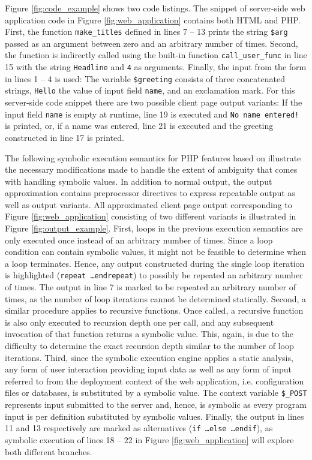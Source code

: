 \documentclass[preprint]{sig-alternate-05-2015}
\begin{document}
Figure \ref{fig:code_example} shows two code listings. The snippet of server-side web
application code in Figure \ref{fig:web_application} contains both HTML and PHP. First, the
function \texttt{make\_titles} defined in lines 7 – 13 prints the string
\texttt{\$arg} passed as an argument between zero and an arbitrary number of
times. Second, the function is indirectly called using the built-in function
\texttt{call\_user\_func} in line 15 with the string \texttt{Headline} and
\texttt{4} as arguments.  Finally, the input from the form in lines 1 – 4 is
used: The variable \texttt{\$greeting} consists of three concatenated strings,
\texttt{Hello} the value of input field \texttt{name}, and an exclamation mark.
For this server-side code snippet there are two possible client page output
variants: If the input field \texttt{name} is empty at runtime, line 19 is
executed and \texttt{No name entered!} is printed, or, if a name was entered,
line 21 is executed and the greeting constructed in line 17 is printed.



The following symbolic execution semantics for PHP features  based on \cite{Nguyen:2014:BCG:2635868.2635928}
illustrate the necessary modifications made to handle the extent of ambiguity
that comes with handling symbolic values. In addition to normal output, the
output approximation contains preprocessor directives to express
repeatable output as well as output variants. All approximated client page
output corresponding to Figure \ref{fig:web_application} consisting of two different variants
is illustrated in Figure \ref{fig:output_example}.
First, loops in the previous execution semantics are only executed once instead
of an arbitrary number of times. Since a loop condition can contain symbolic
values, it might not be feasible to determine when a loop terminates. Hence,
any output constructed during the single loop iteration is highlighted
(\texttt{repeat \ldots  endrepeat}) to possibly be repeated an arbitrary number
of times. The output in line 7 is marked to be repeated an arbitrary number of times, as the number
of loop iterations cannot be determined statically. Second, a similar procedure
applies to recursive functions. Once called, a recursive function is  also only
executed to recursion depth one per call, and any subsequent invocation of that
function returns a symbolic value. This, again, is due to the difficulty to
determine the exact recursion depth similar to the number of loop iterations.
Third, since the symbolic execution engine applies a static analysis, any form
of user interaction providing input data as well as any form of input referred
to from the deployment context of the web application, i.e. configuration files
or databases, is substituted by a symbolic value. The context variable
\texttt{\$\_POST} represents input submitted to the server and, hence, is
symbolic as every program input is per definition substituted by symbolic values. Finally, the
output in lines 11 and 13 respectively are marked as alternatives
(\texttt{if \ldots else \ldots endif}), as symbolic execution of lines 18 – 22
in Figure \ref{fig:web_application} will explore both different branches.
\end{document}
